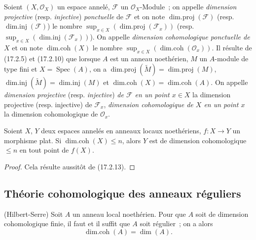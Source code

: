 \begin{env}[17.2.14]
\label{0.17.2.14-fr}
Soient $(X,\mathscr{O}_X)$ un espace annelé, $\mathscr{F}$ un
$\mathscr{O}_X$-Module~; on appelle \emph{dimension projective} (resp.
\emph{injective}) \emph{ponctuelle} de $\mathscr{F}$ et on note
$\operatorname{dim.proj}(\mathscr{F})$ (resp.
$\operatorname{dim.inj}(\mathscr{F})$) le nombre
$\sup_{x\in X}(\operatorname{dim.proj}(\mathscr{F}_x))$ (resp.
$\sup_{x\in X}(\operatorname{dim.inj}(\mathscr{F}_x))$). On appelle
\emph{dimension cohomologique ponctuelle de $X$} et on note
$\operatorname{dim.coh}(X)$ le nombre
$\sup_{x\in X}(\operatorname{dim.coh}(\mathscr{O}_x))$. Il résulte de
(17.2.5) et (17.2.10) que lorsque $A$ est un anneau noethérien, $M$ un
$A$-module de type fini et $X=\operatorname{Spec}(A)$, on a
$\operatorname{dim.proj}(\widetilde{M})=\operatorname{dim.proj}(M)$,
$\operatorname{dim.inj}(\widetilde{M})=\operatorname{dim.inj}(M)$ et
$\operatorname{dim.coh}(X)=\operatorname{dim.coh}(A)$. On appelle
\emph{dimension projective} (resp. \emph{injective}) \emph{de $\mathscr{F}$ en
un point $x\in X$} la dimension projective (resp. injective) de
$\mathscr{F}_x$, \emph{dimension cohomologique de $X$ en un point $x$} la
dimension cohomologique de $\mathscr{O}_x$.
\end{env}

\begin{proposition}[17.2.15]
\label{0.17.2.15-fr}
Soient $X$, $Y$ deux espaces annelés en anneaux locaux noethériens,
$f:X\longrightarrow Y$ un morphisme plat. Si
$\operatorname{dim.coh}(X)\leq n$, alors $Y$ est de dimension cohomologique
$\leq n$ en tout point de $f(X)$.
\end{proposition}

\begin{proof}
Cela résulte aussitôt de (17.2.13).
\end{proof}

\subsection{Théorie cohomologique des anneaux réguliers}
\label{subsection:0.17.3-fr}

\begin{theorem}[17.3.1]
\label{0.17.3.1-fr}
\textnormal{(Hilbert-Serre)} Soit $A$ un anneau local noethérien. Pour que $A$
soit de dimension cohomologique finie, il faut et il suffit que $A$ soit
régulier~; on a alors
\begin{equation}
\label{0.17.3.1.1-fr}
\tag{17.3.1.1}
  \operatorname{dim.coh}(A)=\dim(A).
\end{equation}
\end{theorem}


